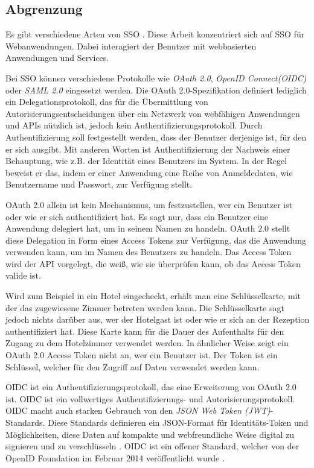 \subsection{Abgrenzung} \label{EB_Abgrenzung}

Es gibt verschiedene Arten von SSO \cite{EB38}. Diese Arbeit konzentriert sich auf SSO für Webanwendungen. Dabei interagiert der Benutzer mit webbasierten Anwendungen und Services.

Bei SSO können verschiedene Protokolle wie \textit{OAuth 2.0}, \textit{OpenID Connect(OIDC)} oder \textit{SAML 2.0} eingesetzt werden. Die OAuth 2.0-Spezifikation definiert lediglich ein Delegationsprotokoll, das für die Übermittlung von Autorisierungsentscheidungen über ein Netzwerk von webfähigen Anwendungen und APIs nützlich ist, jedoch kein Authentifizierungsprotokoll. Durch Authentifizierung soll festgestellt werden, dass der Benutzer derjenige ist, für den er sich ausgibt. Mit anderen Worten ist Authentifizierung der Nachweis einer Behauptung, wie z.B. der Identität eines Benutzers im System. In der Regel beweist er das, indem er einer Anwendung eine Reihe von Anmeldedaten, wie Benutzername und Passwort, zur Verfügung stellt. \cite{OAuth2inAction} \label{OAuthForAuthentication}

OAuth 2.0 allein ist kein Mechanismus, um festzustellen, wer ein Benutzer ist oder wie er sich authentifiziert hat. Es sagt nur, dass ein Benutzer eine Anwendung delegiert hat, um in seinem Namen zu handeln. OAuth 2.0 stellt diese Delegation in Form eines Access Tokens zur Verfügung, das die Anwendung verwenden kann, um im Namen des Benutzers zu handeln. Das Access Token wird der API vorgelegt, die weiß, wie sie überprüfen kann, ob das Access Token valide ist. \cite{AuthorizationvsAuthentication}

Wird zum Beispiel in ein Hotel eingecheckt, erhält man eine Schlüsselkarte, mit der das zugewiesene Zimmer betreten werden kann. Die Schlüsselkarte sagt jedoch nichts darüber aus, wer der Hotelgast ist oder wie er sich an der Rezeption authentifiziert hat. Diese Karte kann für die Dauer des Aufenthalts für den Zugang zu dem Hotelzimmer verwendet werden. In ähnlicher Weise zeigt ein OAuth 2.0 Access Token nicht an, wer ein Benutzer ist. Der Token ist ein Schlüssel, welcher für den Zugriff auf Daten verwendet werden kann. \cite{AuthorizationvsAuthentication}

OIDC ist ein Authentifizierungsprotokoll, das eine Erweiterung von OAuth 2.0 ist. OIDC ist ein vollwertiges Authentifizierungs- und Autorisierungsprotokoll. OIDC macht auch starken Gebrauch von den \textit{JSON Web Token (JWT)}-Standards. Diese Standards definieren ein JSON-Format für Identitäts-Token und Möglichkeiten, diese Daten auf kompakte und webfreundliche Weise digital zu signieren und zu verschlüsseln \cite{ssoProtocols}. OIDC ist ein offener Standard, welcher von der OpenID Foundation im Februar 2014 veröffentlicht wurde \cite{OAuth2inAction}.

